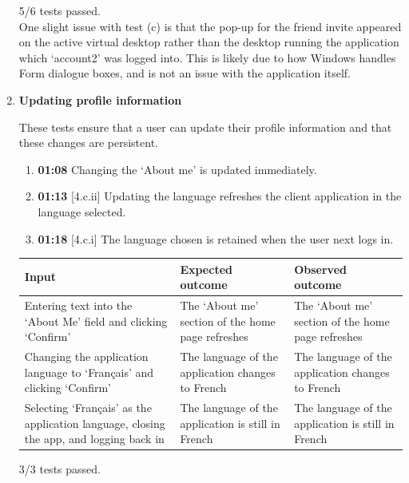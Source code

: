\documentclass{article}
\begin{document}
\begin{enumerate}
    5/6 tests passed. \\

    One slight issue with test (c) is that the pop-up for the friend invite appeared on the active virtual desktop rather than the desktop running the application which `account2' was logged into. This is likely due to how Windows handles Form dialogue boxes, and is not an issue with the application itself. \\

    \item \textbf{Updating profile information}
    
    These tests ensure that a user can update their profile information and that these changes are persistent.

    \begin{enumerate}
        \item \textbf{01:08} Changing the `About me' is updated immediately.
        \item \textbf{01:13} [4.c.ii] Updating the language refreshes the client application in the language selected.
        \item \textbf{01:18} [4.c.i] The language chosen is retained when the user next logs in.
    \end{enumerate}

    \begin{table}[H]
    \centering
        \begin{tabularx}{\textwidth}{|L|L|L|}
        \hline
        \textbf{Input} & \textbf{Expected outcome} & \textbf{Observed outcome} \\\hline
        Entering text into the `About Me' field and clicking `Confirm' & The `About me' section of the home page refreshes & The `About me' section of the home page refreshes \\\hline
        Changing the application language to `Français' and clicking `Confirm' & The language of the application changes to French & The language of the application changes to French \\\hline
        Selecting `Français' as the application language, closing the app, and logging back in & The language of the application is still in French & The language of the application is still in French \\\hline
        \end{tabularx}
    \end{table}

    3/3 tests passed. \\


\end{enumerate}
\end{document}
